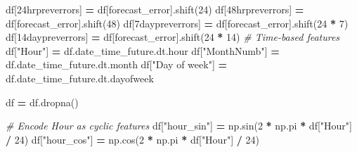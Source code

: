 \documentclass[mstat,12pt]{unswthesis}
\newenvironment{Shaded}{\begin{snugshade}}{\end{snugshade}}
\newcommand{\CommentTok}[1]{\textcolor[rgb]{0.56,0.35,0.01}{\textit{#1}}}
\newcommand{\DecValTok}[1]{\textcolor[rgb]{0.00,0.00,0.81}{#1}}
\newcommand{\NormalTok}[1]{#1}
\newcommand{\OperatorTok}[1]{\textcolor[rgb]{0.81,0.36,0.00}{\textbf{#1}}}
\newcommand{\StringTok}[1]{\textcolor[rgb]{0.31,0.60,0.02}{#1}}
\begin{document}
\begin{Shaded}
\begin{Highlighting}[]
\NormalTok{df[}\StringTok{\textquotesingle{}24hrpreverrors\textquotesingle{}}\NormalTok{] }\OperatorTok{=}\NormalTok{ df[}\StringTok{\textquotesingle{}forecast\_error\textquotesingle{}}\NormalTok{].shift(}\DecValTok{24}\NormalTok{)}
\NormalTok{df[}\StringTok{\textquotesingle{}48hrpreverrors\textquotesingle{}}\NormalTok{] }\OperatorTok{=}\NormalTok{ df[}\StringTok{\textquotesingle{}forecast\_error\textquotesingle{}}\NormalTok{].shift(}\DecValTok{48}\NormalTok{)}
\NormalTok{df[}\StringTok{\textquotesingle{}7daypreverrors\textquotesingle{}}\NormalTok{] }\OperatorTok{=}\NormalTok{ df[}\StringTok{\textquotesingle{}forecast\_error\textquotesingle{}}\NormalTok{].shift(}\DecValTok{24} \OperatorTok{*} \DecValTok{7}\NormalTok{)}
\NormalTok{df[}\StringTok{\textquotesingle{}14daypreverrors\textquotesingle{}}\NormalTok{] }\OperatorTok{=}\NormalTok{ df[}\StringTok{\textquotesingle{}forecast\_error\textquotesingle{}}\NormalTok{].shift(}\DecValTok{24} \OperatorTok{*} \DecValTok{14}\NormalTok{)}
\CommentTok{\# Time{-}based features}
\NormalTok{df[}\StringTok{"Hour"}\NormalTok{] }\OperatorTok{=}\NormalTok{ df.date\_time\_future.dt.hour}
\NormalTok{df[}\StringTok{"MonthNumb"}\NormalTok{] }\OperatorTok{=}\NormalTok{ df.date\_time\_future.dt.month}
\NormalTok{df[}\StringTok{"Day of week"}\NormalTok{] }\OperatorTok{=}\NormalTok{ df.date\_time\_future.dt.dayofweek}

\NormalTok{df }\OperatorTok{=}\NormalTok{ df.dropna()}



\CommentTok{\# Encode Hour as cyclic features}
\NormalTok{df[}\StringTok{"hour\_sin"}\NormalTok{] }\OperatorTok{=}\NormalTok{ np.sin(}\DecValTok{2} \OperatorTok{*}\NormalTok{ np.pi }\OperatorTok{*}\NormalTok{ df[}\StringTok{"Hour"}\NormalTok{] }\OperatorTok{/} \DecValTok{24}\NormalTok{)}
\NormalTok{df[}\StringTok{"hour\_cos"}\NormalTok{] }\OperatorTok{=}\NormalTok{ np.cos(}\DecValTok{2} \OperatorTok{*}\NormalTok{ np.pi }\OperatorTok{*}\NormalTok{ df[}\StringTok{"Hour"}\NormalTok{] }\OperatorTok{/} \DecValTok{24}\NormalTok{)}


\end{Highlighting}
\end{Shaded}
\end{document}
